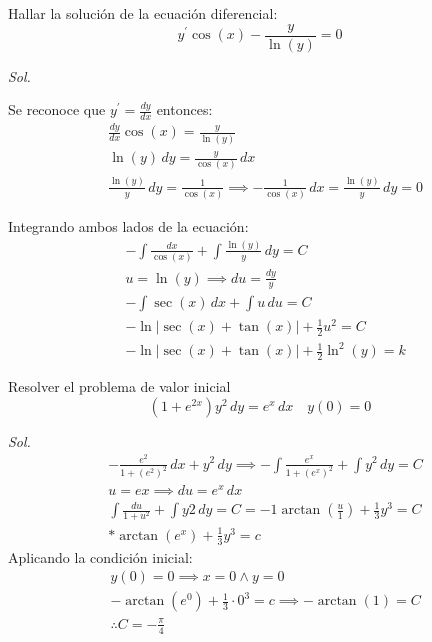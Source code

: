 \begin{example}
    Hallar la solución de la ecuación diferencial:
    \begin{equation*}
        y^{\prime}\cos{(x)}-\frac{y}{\ln{(y)}}=0
    \end{equation*}
\end{example}

\textit{ Sol. }

Se reconoce que $y^{\prime}=\frac{dy}{dx}$ entonces:
\begin{align*}
    &\frac{dy}{dx}\cos{(x)}=\frac{y}{\ln{(y)}}\\
    &\ln{(y)}\, dy=\frac{y}{\cos{(x)}}\, dx\\
    &\frac{\ln{(y)}}{y}\, dy=\frac{1}{\cos{(x)}}\implies -\frac{1}{\cos{(x)}}\, dx=\frac{\ln{(y)}}{y}\, dy=0
\end{align*}

Integrando ambos lados de la ecuación:
\begin{align*}
    &-\int\frac{dx}{\cos{(x)}}+\int\frac{\ln{(y)}}{y}\, dy=C\\
    &u=\ln{(y)}\implies du=\frac{dy}{y}\\
    &-\int \sec{(x)}\,dx+\int u\, du=C\\
    &-\ln{\left\lvert \sec{(x)}+\tan{(x)}\right\rvert}+\frac{1}{2}u^2=C\\
    &-\ln{\left\lvert \sec{(x)}+\tan{(x)}\right\rvert}+\frac{1}{2}\ln^2{(y)}=k
\end{align*}

\begin{example}
    Resolver el problema de valor inicial
    \begin{equation*}
        \left(1+e^{2x}\right)y^2\,dy=e^x\,dx\quad y(0)=0
    \end{equation*}
\end{example}

\textit{ Sol. }
\begin{align*}
    &-\frac{e^2}{1+(e^2)^2}\, dx+y^2\, dy\implies -\int \frac{e^x}{1+\left(e^x\right)^2}+\int y^2\, dy=C\\
    &u=ex\implies du=e^x\, dx\\
    &\int \frac{du}{1+u^2}+\int y2\, dy=C=-1\arctan{\left(\frac{u}{1}\right)}+\frac{1}{3}y^3=C\\
    &*\arctan{(e^x)}+\frac{1}{3}y^3=c
\end{align*}
Aplicando la condición inicial:
\begin{align*}
    &y(0)=0\implies x=0\land y=0\\
    &-\arctan(e^0)+\frac{1}{3}\cdot 0^3=c\implies -\arctan{(1)}=C\\
    &\therefore C=-\frac{\pi}{4}
\end{align*}

